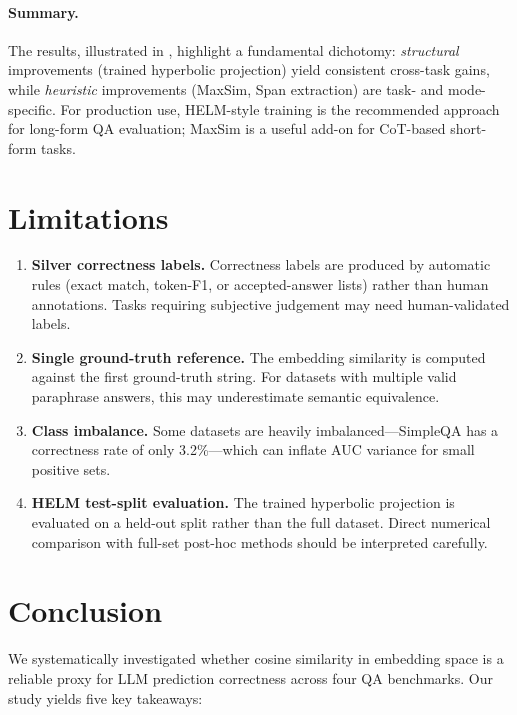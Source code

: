 \documentclass{article}
\begin{document}
\paragraph{Summary.}
The results, illustrated in , highlight a fundamental dichotomy:
\emph{structural} improvements (trained hyperbolic projection) yield consistent
cross-task gains, while \emph{heuristic} improvements (MaxSim, Span extraction)
are task- and mode-specific.
For production use, HELM-style training is the recommended approach for long-form QA
evaluation; MaxSim is a useful add-on for CoT-based short-form tasks.

\section{Limitations}
\label{sec:limitations}

\begin{enumerate}[nosep]
  \item \textbf{Silver correctness labels.}  Correctness labels are produced by
        automatic rules (exact match, token-F1, or accepted-answer lists) rather
        than human annotations.  Tasks requiring subjective judgement may need
        human-validated labels.
  \item \textbf{Single ground-truth reference.}  The embedding similarity is
        computed against the first ground-truth string.  For datasets with multiple
        valid paraphrase answers, this may underestimate semantic equivalence.
  \item \textbf{Class imbalance.}  Some datasets are heavily imbalanced---SimpleQA
        has a correctness rate of only 3.2\%---which can inflate AUC variance for
        small positive sets.
  \item \textbf{HELM test-split evaluation.}  The trained hyperbolic projection is
        evaluated on a held-out split rather than the full dataset.  Direct numerical
        comparison with full-set post-hoc methods should be interpreted carefully.
\end{enumerate}

\section{Conclusion}
\label{sec:conclusion}

We systematically investigated whether cosine similarity in embedding space is a
reliable proxy for LLM prediction correctness across four QA benchmarks.
Our study yields five key takeaways:
\end{document}
